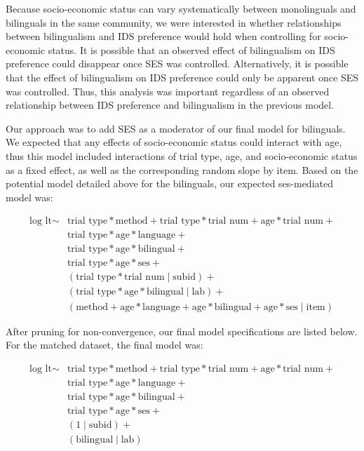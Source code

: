 \documentclass[english,,man,floatsintext]{apa6}
\begin{document}
Because socio-economic status can vary systematically between monolinguals and bilinguals in the same community, we were interested in whether relationships between bilingualism and IDS preference would hold when controlling for socio-economic status. It is possible that an observed effect of bilingualism on IDS preference could disappear once SES was controlled. Alternatively, it is possible that the effect of bilingualism on IDS preference could only be apparent once SES was controlled. Thus, this analysis was important regardless of an observed relationship between IDS preference and bilingualism in the previous model.

Our approach was to add SES as a moderator of our final model for bilinguals. We expected that any effects of socio-economic status could interact with age, thus this model included interactions of trial type, age, and socio-economic status as a fixed effect, as well as the corresponding random slope by item. Based on the potential model detailed above for the bilinguals, our expected ses-mediated model was:

\begin{equation}
\begin{split}
\text{log lt} \sim & \text{trial type} * \text{method} + \text{trial type} * \text{trial num} + \text{age} * \text{trial num} + \\
& \text{trial type} * \text{age} * \text{language} + \\
& \text{trial type} * \text{age} * \text{bilingual} + \\
& \text{trial type} * \text{age} * \text{ses} + \\
& (\text{trial type} * \text{trial num} \mid \text{subid}) + \\
& (\text{trial type} * \text{age} * \text{bilingual} \mid \text{lab}) + \\
& (\text{method} + \text{age} * \text{language} + \text{age} * \text{bilingual} +
\text{age} * \text{ses} \mid \text{item})
\end{split}
\end{equation}

After pruning for non-convergence, our final model specifications are listed below. For the matched dataset, the final model was:

\begin{equation}
\begin{split}
\text{log lt} \sim & \text{trial type} * \text{method} + \text{trial type} * \text{trial num} + \text{age} * \text{trial num} + \\
& \text{trial type} * \text{age} * \text{language} + \\
& \text{trial type} * \text{age} * \text{bilingual} + \\
& \text{trial type} * \text{age} * \text{ses} + \\
& (1 \mid \text{subid}) + \\
& (\text{bilingual} \mid \text{lab}) 
\end{split}
\end{equation}
\end{document}
